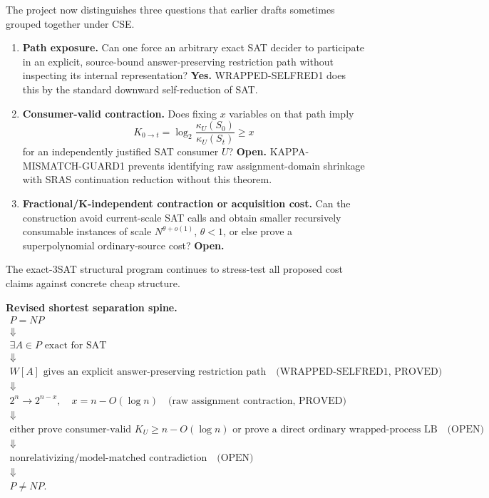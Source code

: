 \documentclass[11pt]{article}
\theoremstyle{plain}
\theoremstyle{definition}
\theoremstyle{remark}
\begin{document}
The project now distinguishes three questions that earlier drafts sometimes
grouped together under CSE.

\begin{enumerate}[leftmargin=1.6em]
\item \textbf{Path exposure.}
Can one force an arbitrary exact SAT decider to participate in an explicit,
source-bound answer-preserving restriction path without inspecting its
internal representation?  \textbf{Yes.}  WRAPPED-SELFRED1 does this by the
standard downward self-reduction of SAT.

\item \textbf{Consumer-valid contraction.}
Does fixing \(x\) variables on that path imply
\[
K_{0\to t}
=
\log_2\frac{\kappa_U(S_0)}{\kappa_U(S_t)}
\ge x
\]
for an independently justified SAT consumer \(U\)?  \textbf{Open.}
KAPPA-MISMATCH-GUARD1 prevents identifying raw assignment-domain shrinkage
with SRAS continuation reduction without this theorem.

\item \textbf{Fractional/K-independent contraction or acquisition cost.}
Can the construction avoid current-scale SAT calls and obtain smaller
recursively consumable instances of scale \(N^{\theta+o(1)}\),
\(\theta<1\), or else prove a superpolynomial ordinary-source cost?
\textbf{Open.}
\end{enumerate}

The exact-3SAT structural program continues to stress-test all proposed cost
claims against concrete cheap structure.

\begin{candidatebox}
\textbf{Revised shortest separation spine.}
\[
\boxed{
\begin{array}{c}
P=NP\\
\Downarrow\\
\exists A\in P\text{ exact for SAT}\\
\Downarrow\\
W[A]\text{ gives an explicit answer-preserving restriction path}
\quad\text{(WRAPPED-SELFRED1, PROVED)}\\
\Downarrow\\
2^n\to 2^{n-x},\quad
x=n-O(\log n)
\quad\text{(raw assignment contraction, PROVED)}\\
\Downarrow\\
\text{either prove consumer-valid }K_U\ge n-O(\log n)
\text{ or prove a direct ordinary wrapped-process LB}
\quad\text{(OPEN)}\\
\Downarrow\\
\text{nonrelativizing/model-matched contradiction}
\quad\text{(OPEN)}\\
\Downarrow\\
P\ne NP.
\end{array}}
\]
\end{candidatebox}
\end{document}
